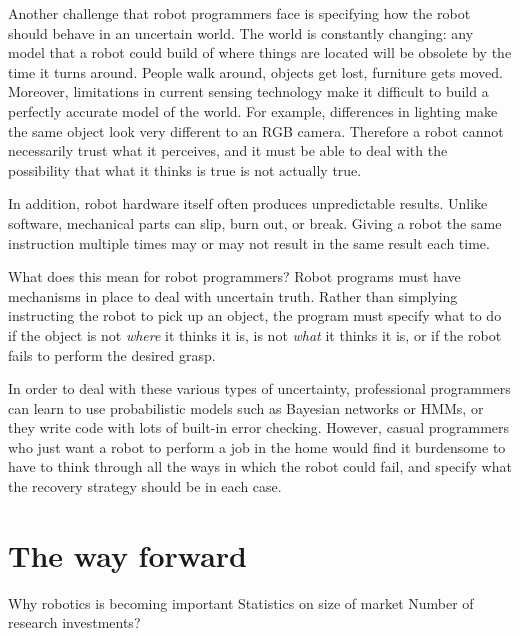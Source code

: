 \documentclass{article}
\begin{document}
Another challenge that robot programmers face is specifying how the robot should behave in an uncertain world. The world is constantly changing: any model that a robot could build of where things are located will be obsolete by the time it turns around. People walk around, objects get lost, furniture gets moved. Moreover, limitations in current sensing technology make it difficult to build a perfectly accurate model of the world. For example, differences in lighting make the same object look very different to an RGB camera. Therefore a robot cannot necessarily trust what it perceives, and it must be able to deal with the possibility that what it thinks is true is not actually true.

In addition, robot hardware itself often produces unpredictable results. Unlike software, mechanical parts can slip, burn out, or break. Giving a robot the same instruction multiple times may or may not result in the same result each time.

What does this mean for robot programmers? Robot programs must have mechanisms in place to deal with uncertain truth. Rather than simplying instructing the robot to pick up an object, the program must specify what to do if the object is not {\em where} it thinks it is, is not {\em what} it thinks it is, or if the robot fails to perform the desired grasp.

In order to deal with these various types of uncertainty, professional programmers can learn to use probabilistic models such as Bayesian networks or HMMs, or they write code with lots of built-in error checking. However, casual programmers who just want a robot to perform a job in the home would find it burdensome to have to think through all the ways in which the robot could fail, and specify what the recovery strategy should be in each case.

\section{The way forward}


















Why robotics is becoming important
Statistics on size of market
Number of research investments?
\end{document}
